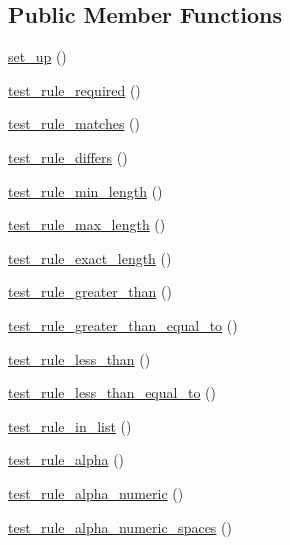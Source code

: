 \subsection*{Public Member Functions}
\begin{DoxyCompactItemize}
\item 
\hyperlink{class_form__validation__test_a69829875c8d4b6ce94908445c4155741}{set\+\_\+up} ()
\item 
\hyperlink{class_form__validation__test_ac41b86603734818629c9940bac1ea641}{test\+\_\+rule\+\_\+required} ()
\item 
\hyperlink{class_form__validation__test_aaeb759c1c8e64245f9652763d4f2a316}{test\+\_\+rule\+\_\+matches} ()
\item 
\hyperlink{class_form__validation__test_aec0b0f58e31d5e9a6a993629f25f675c}{test\+\_\+rule\+\_\+differs} ()
\item 
\hyperlink{class_form__validation__test_a7a8071237895f7891434cc3af0d0f16f}{test\+\_\+rule\+\_\+min\+\_\+length} ()
\item 
\hyperlink{class_form__validation__test_a4c45d7b8863f8e7ef45c567e56b7c2eb}{test\+\_\+rule\+\_\+max\+\_\+length} ()
\item 
\hyperlink{class_form__validation__test_a4a7e47240b8aa2ceceb7c5821e2da5bd}{test\+\_\+rule\+\_\+exact\+\_\+length} ()
\item 
\hyperlink{class_form__validation__test_afd327876b26b5ab8f4c68aa81a66ce0b}{test\+\_\+rule\+\_\+greater\+\_\+than} ()
\item 
\hyperlink{class_form__validation__test_a5e7b0f2c55cab1c27419935532c93dae}{test\+\_\+rule\+\_\+greater\+\_\+than\+\_\+equal\+\_\+to} ()
\item 
\hyperlink{class_form__validation__test_a395861f6382795e264ec7268743c8351}{test\+\_\+rule\+\_\+less\+\_\+than} ()
\item 
\hyperlink{class_form__validation__test_a9b9d7c63b02da99457759aebad3f977e}{test\+\_\+rule\+\_\+less\+\_\+than\+\_\+equal\+\_\+to} ()
\item 
\hyperlink{class_form__validation__test_a798fbf69f60b8b662e9bf15924baae6f}{test\+\_\+rule\+\_\+in\+\_\+list} ()
\item 
\hyperlink{class_form__validation__test_abc216ba6c0aec5cd6f54b6235e38c3f6}{test\+\_\+rule\+\_\+alpha} ()
\item 
\hyperlink{class_form__validation__test_af42c410d141904b45148ad980a60bfd6}{test\+\_\+rule\+\_\+alpha\+\_\+numeric} ()
\item 
\hyperlink{class_form__validation__test_afdef3f1f6422618e0a10f07bdbe36bf8}{test\+\_\+rule\+\_\+alpha\+\_\+numeric\+\_\+spaces} ()

\end{DoxyCompactItemize}
